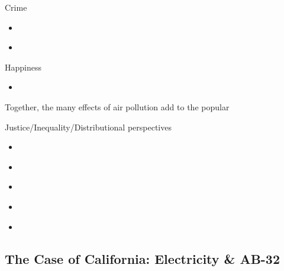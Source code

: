 \noindent Crime
\begin{itemize}
    \item \cite{bondy2020crime}
    \item \cite{burkhardt2019effect}
\end{itemize}

\noindent Happiness
\begin{itemize}
    \item \cite{zheng2019air}
\end{itemize}

Together, the many effects of air pollution add to the popular 






\noindent Justice/Inequality/Distributional perspectives
\begin{itemize}
    \item \cite{colmer2020disparities}
    \item \cite{hernandez2022decomposing}
    \item \cite{currie2023caused}
    \item \cite{banzhaf2019environmental}
    \item \cite{voorheis2017air}
\end{itemize}






\subsection{The Case of California: Electricity \& AB-32}

